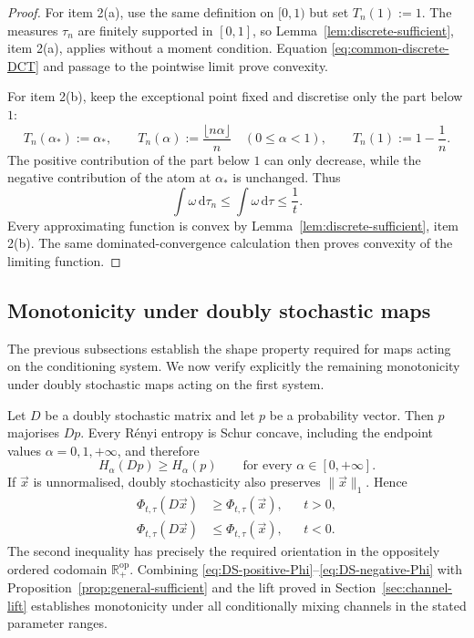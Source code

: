 \documentclass[aps,pra,11pt,onecolumn,nofootinbib,tightenlines]{revtex4-2}
\theoremstyle{definition}
\begin{document}
\begin{proof}
For item 2(a), use the same definition on $[0,1)$ but set $T_n(1):=1$. The measures $\tau_n$ are finitely supported in $[0,1]$, so Lemma~\ref{lem:discrete-sufficient}, item 2(a), applies without a moment condition. Equation \eqref{eq:common-discrete-DCT} and passage to the pointwise limit prove convexity.

For item 2(b), keep the exceptional point fixed and discretise only the part below $1$:
\begin{equation}
 T_n(\alpha_*):=\alpha_*,
 \qquad
 T_n(\alpha):=\frac{\lfloor n\alpha\rfloor}{n}
 \quad(0\leq\alpha<1),
 \qquad
 T_n(1):=1-\frac1n.
 \label{eq:exceptional-quantizer}
\end{equation}
The positive contribution of the part below $1$ can only decrease, while the negative contribution of the atom at $\alpha_*$ is unchanged. Thus
\begin{equation}
 \int\omega\,\mathrm d\tau_n
 \leq\int\omega\,\mathrm d\tau
 \leq\frac1t.
 \label{eq:exceptional-moment-preservation}
\end{equation}
Every approximating function is convex by Lemma~\ref{lem:discrete-sufficient}, item 2(b). The same dominated-convergence calculation then proves convexity of the limiting function.
\end{proof}

\subsection{Monotonicity under doubly stochastic maps}

The previous subsections establish the shape property required for maps acting on the conditioning system. We now verify explicitly the remaining monotonicity under doubly stochastic maps acting on the first system.

Let $D$ be a doubly stochastic matrix and let $p$ be a probability vector. Then $p$ majorises $Dp$. Every R\'enyi entropy is Schur concave, including the endpoint values $\alpha=0,1,+\infty$, and therefore
\begin{equation}
 H_\alpha(Dp)\geq H_\alpha(p)
 \qquad
 \text{for every }\alpha\in[0,+\infty].
 \label{eq:renyi-DS-monotonicity}
\end{equation}
If $\vec x$ is unnormalised, doubly stochasticity also preserves $\|\vec x\|_1$. Hence
\begin{align}
 \Phi_{t,\tau}(D\vec x)
 &\geq\Phi_{t,\tau}(\vec x), && t>0,
 \label{eq:DS-positive-Phi}\\
 \Phi_{t,\tau}(D\vec x)
 &\leq\Phi_{t,\tau}(\vec x), && t<0.
 \label{eq:DS-negative-Phi}
\end{align}
The second inequality has precisely the required orientation in the oppositely ordered codomain $\mathbb R_+^{\mathrm{op}}$. Combining \eqref{eq:DS-positive-Phi}--\eqref{eq:DS-negative-Phi} with Proposition~\ref{prop:general-sufficient} and the lift proved in Section~\ref{sec:channel-lift} establishes monotonicity under all conditionally mixing channels in the stated parameter ranges.
\end{document}
